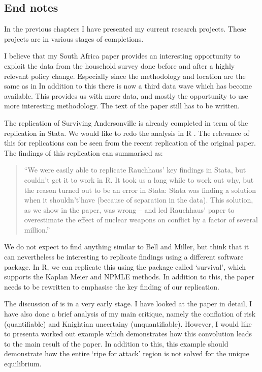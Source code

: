 \documentclass[a4paper]{report}\usepackage{graphicx, color}
\begin{document}
\begin{refsection}
\chapter{End notes}
\label{end-notes}
In the previous chapters I have presented my current research projects. These projects are in various stages of completions.

I believe that my South Africa paper provides an interesting opportunity to exploit the data from the household survey done before and after a highly relevant policy change. Especially since the methodology and location are the same as in \textcite{duflo2000, duflo2003} In addition to this there is now a third data wave which has become available. This provides us with more data, and mostly the opportunity to use more interesting methodology. The text of the paper still has to be written. 

The replication of Surviving Andersonville is already completed in term of the replication in Stata. We would like to redo the analysis in R \parencite{R}. The relevance of this for replications can be seen from the recent replication \textcite{bell2013questioning} of the original \textcite{rauchhaus2009evaluating} paper. The findings of this replication can summarised as:

\begin{quote}
``We were easily able to replicate Rauchhaus’ key findings in Stata, but couldn't get it to work in R. It took us a long while to work out why, but the reason turned out to be an error in Stata: Stata was finding a solution when it shouldn’t'have (because of separation in the data). This solution, as we show in the paper, was wrong – and led Rauchhaus’ paper to overestimate the effect of nuclear weapons on conflict by a factor of several million.''~\parencite{bell2013questioning}
\end{quote}


We do not expect to find anything similar to Bell and Miller, but think that it can nevertheless be interesting to replicate findings using a different software package. In R, we can replicate this using the package called `survival', which supports the Kaplan Meier and NPMLE methods. In addition to this, the paper needs to be rewritten to emphasise the key finding of our replication.

The discussion of \textcite{morris1998unique} is in a very early stage. I have looked at the paper in detail, I have also done a brief analysis of my main critique, namely the conflation of risk (quantifiable) and Knightian uncertainy (unquantifiable). However, I would like to presenta worked out example which demonstrates how this convolution leads to the main result of the paper. In addition to this, this example should demonstrate how the entire `ripe for attack' region is not solved for the unique equilibrium.


\end{refsection}
\end{document}
